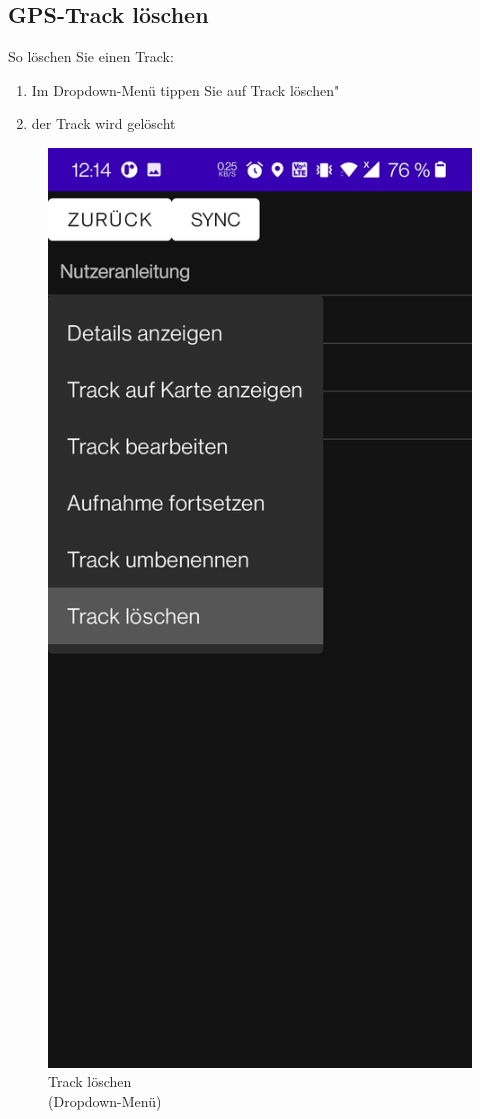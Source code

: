 \documentclass{article}
\begin{document}
\subsection{GPS-Track löschen}
	So löschen Sie einen Track:
	\begin{enumerate}
		\item Im Dropdown-Menü tippen Sie auf \glqq Track löschen"
		\item der Track wird gelöscht
	\end{enumerate}
	\begin{figure}[H]
		\captionsetup{justification=centering}
		\includegraphics[scale=0.15]{13_loeschen.jpg}
		\centering
		\caption{Track löschen \\(Dropdown-Menü)}
	\end{figure}
\end{document}
